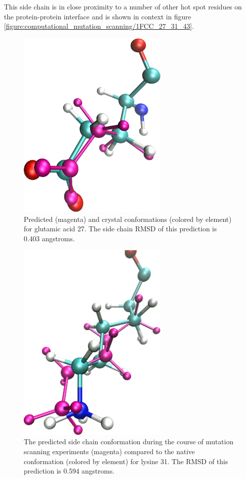 This side chain is in close proximity to a number of other hot spot residues on the protein-protein interface and is shown in context in figure \protect\ref{figure:computational_mutation_scanning/1FCC_27_31_43}.
\begin{figure}[h]
  \centering
  \includegraphics[width=0.65\textwidth,height=0.3\textheight,keepaspectratio]{figures/mutation_side_chain_images/1fcc_27.png}
  \caption{Predicted (magenta) and crystal conformations (colored by element) for glutamic acid 27.
The side chain RMSD of this prediction is 0.403 angstroms.}
  \label{figure:computational_mutation_scanning/1FCC_27}
\end{figure}

\begin{figure}[h]
  \centering
  \includegraphics[width=0.65\textwidth,height=0.3\textheight,keepaspectratio]{figures/mutation_side_chain_images/1fcc_31.png}
  \caption{The predicted side chain conformation during the course of mutation scanning experiments (magenta) compared to the native conformation (colored by element) for lysine 31.
The RMSD of this prediction is 0.594 angstroms.}
  \label{figure:computational_mutation_scanning/1FCC_31}
\end{figure}

